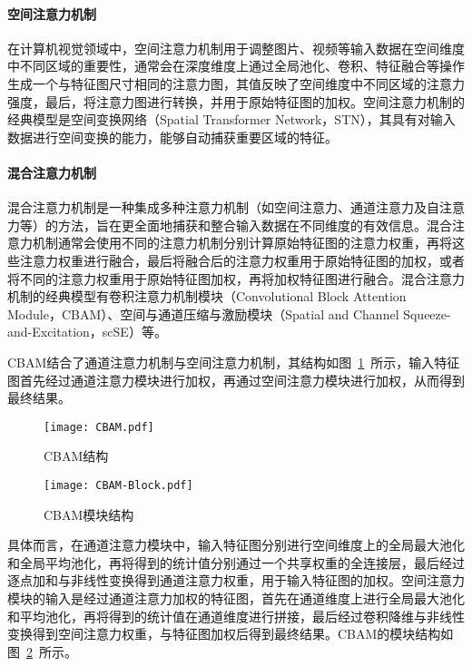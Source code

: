 \paragraph{空间注意力机制}
    
在计算机视觉领域中，空间注意力机制用于调整图片、视频等输入数据在空间维度中不同区域的重要性，通常会在深度维度上通过全局池化、卷积、特征融合等操作生成一个与特征图尺寸相同的注意力图，其值反映了空间维度中不同区域的注意力强度，最后，将注意力图进行转换，并用于原始特征图的加权。空间注意力机制的经典模型是空间变换网络（Spatial Transformer Network，STN）\cite{jaderberg2015spatial}，其具有对输入数据进行空间变换的能力，能够自动捕获重要区域的特征。

\paragraph{混合注意力机制}
    
混合注意力机制是一种集成多种注意力机制（如空间注意力、通道注意力及自注意力等）的方法，旨在更全面地捕获和整合输入数据在不同维度的有效信息。混合注意力机制通常会使用不同的注意力机制分别计算原始特征图的注意力权重，再将这些注意力权重进行融合，最后将融合后的注意力权重用于原始特征图的加权，或者将不同的注意力权重用于原始特征图加权，再将加权特征图进行融合。混合注意力机制的经典模型有卷积注意力机制模块（Convolutional Block Attention Module，CBAM）\cite{woo2018cbam}、空间与通道压缩与激励模块（Spatial and Channel Squeeze-and-Excitation，scSE）\cite{roy2018concurrent}等。
    
CBAM结合了通道注意力机制与空间注意力机制，其结构如图~\ref{fig:CBAM}~所示，输入特征图首先经过通道注意力模块进行加权，再通过空间注意力模块进行加权，从而得到最终结果。
\begin{figure}
    \centering
    \texttt{[image: CBAM.pdf]}
    \caption{CBAM结构\cite{woo2018cbam}}
    \label{fig:CBAM}
\end{figure}
\begin{figure}
    \centering
    \texttt{[image: CBAM-Block.pdf]}
    \caption{CBAM模块结构\cite{woo2018cbam}}
    \label{fig:CBAM-Block}
  \end{figure}

具体而言，在通道注意力模块中，输入特征图分别进行空间维度上的全局最大池化和全局平均池化，再将得到的统计值分别通过一个共享权重的全连接层，最后经过逐点加和与非线性变换得到通道注意力权重，用于输入特征图的加权。空间注意力模块的输入是经过通道注意力加权的特征图，首先在通道维度上进行全局最大池化和平均池化，再将得到的统计值在通道维度进行拼接，最后经过卷积降维与非线性变换得到空间注意力权重，与特征图加权后得到最终结果。CBAM的模块结构如图~\ref{fig:CBAM-Block}~所示。

